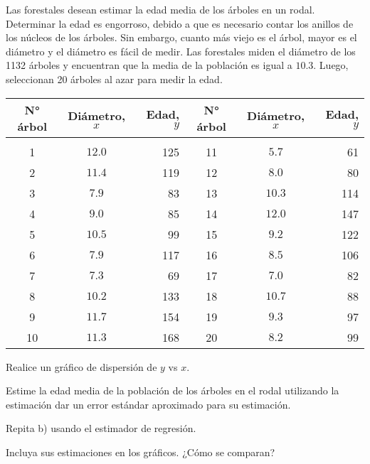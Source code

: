 \addpoints
\question Las forestales desean estimar la edad media de los árboles en un rodal. Determinar la edad es engorroso, debido a que es necesario contar los anillos de los núcleos de los árboles. Sin embargo, cuanto más viejo es el árbol, mayor es el diámetro y el diámetro es fácil de medir. Las forestales miden el diámetro de los 1132 árboles y encuentran que la media de la población es igual a $10.3$.  Luego, seleccionan 20 árboles al azar para medir la edad.

\begin{center}
\begin{tabular}{ccrccr} 
N° árbol & Diámetro, $x$ & Edad, $y$ & N° árbol & Diámetro, $x$ & Edad, $y$ \\
\hline & & & & & \\
1 & $12.0$ & 125 & 11 & $5.7$ & 61 \\
2 & $11.4$ & 119 & 12 & $8.0$ & 80 \\
3 & $7.9$ & 83 & 13 & $10.3$ & 114 \\
4 & $9.0$ & 85 & 14 & $12.0$ & 147 \\
5 & $10.5$ & 99 & 15 & $9.2$ & 122 \\
6 & $7.9$ & 117 & 16 & $8.5$ & 106 \\
7 & $7.3$ & 69 & 17 & $7.0$ & 82 \\
8 & $10.2$ & 133 & 18 & $10.7$ & 88 \\
9 & $11.7$ & 154 & 19 & $9.3$ & 97 \\
10 & $11.3$ & 168 & 20 & $8.2$ & 99
\end{tabular}
\end{center}
\noaddpoints
\begin{parts}
\item Realice un gráfico de dispersión de $y$ vs $x$.
\item Estime la edad media de la población de los árboles en el rodal utilizando la estimación
dar un error estándar aproximado para su estimación.
\item Repita b) usando el estimador de regresión.
\item Incluya sus estimaciones en los gráficos. ¿Cómo se comparan?
\end{parts}